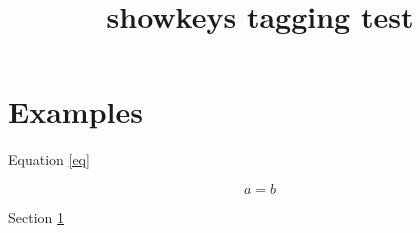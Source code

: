 \documentclass{article}
\title{showkeys tagging test}
\begin{document}
\section{Examples}\label{sec}

Equation \ref{eq}

\begin{equation}
a=b \label{eq}
\end{equation}

Section \ref{sec}
\end{document}
